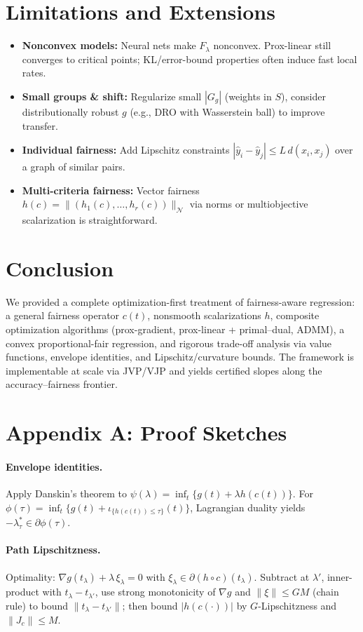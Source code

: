 \documentclass[11pt]{article}
\theoremstyle{plain}
\theoremstyle{definition}
\newcommand{\1}{\mathbf{1}}
\newcommand{\indC}[1]{\iota_{#1}}
\begin{document}
\section{Limitations and Extensions}
\begin{itemize}[leftmargin=2em]
 \item \textbf{Nonconvex models:} Neural nets make $F_\lambda$ nonconvex. Prox-linear still converges to critical points; KL/error-bound properties often induce fast local rates.
 \item \textbf{Small groups \& shift:} Regularize small $|G_g|$ (weights in $S$), consider distributionally robust $g$ (e.g., DRO with Wasserstein ball) to improve transfer.
 \item \textbf{Individual fairness:} Add Lipschitz constraints $|\hat y_i-\hat y_j|\le L\,d(x_i,x_j)$ over a graph of similar pairs.
 \item \textbf{Multi-criteria fairness:} Vector fairness $h(c)=\|(h_1(c),\dots,h_r(c))\|_{\mathcal{N}}$ via norms or multiobjective scalarization is straightforward.
\end{itemize}

\section*{Conclusion}
We provided a complete optimization-first treatment of fairness-aware regression: a general fairness operator $c(t)$, nonsmooth scalarizations $h$, composite optimization algorithms (prox-gradient, prox-linear + primal--dual, ADMM), a convex proportional-fair regression, and rigorous trade-off analysis via value functions, envelope identities, and Lipschitz/curvature bounds. The framework is implementable at scale via JVP/VJP and yields certified slopes along the accuracy--fairness frontier.

\appendix
\section{Appendix A: Proof Sketches}
\paragraph{Envelope identities.} Apply Danskin’s theorem to $\psi(\lambda)=\inf_t \{g(t)+\lambda h(c(t))\}$. For $\phi(\tau)=\inf_t \{g(t)+\indC{\{h(c(t))\le \tau\}}(t)\}$, Lagrangian duality yields $-\lambda^*_\tau\in\partial\phi(\tau)$.
\paragraph{Path Lipschitzness.} Optimality: $\nabla g(t_\lambda)+\lambda\,\xi_\lambda=0$ with $\xi_\lambda\in\partial(h\circ c)(t_\lambda)$. Subtract at $\lambda'$, inner-product with $t_\lambda-t_{\lambda'}$, use strong monotonicity of $\nabla g$ and $\|\xi\|\le GM$ (chain rule) to bound $\|t_\lambda-t_{\lambda'}\|$; then bound $|h(c(\cdot))|$ by $G$-Lipschitzness and $\|J_c\|\le M$.
\end{document}

